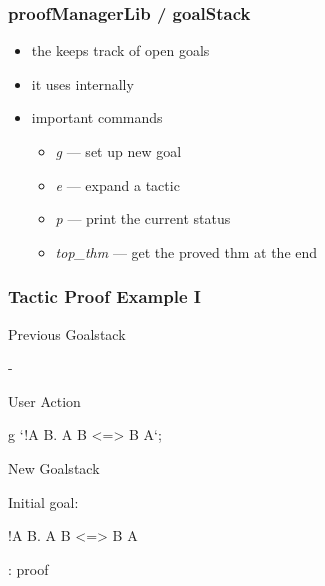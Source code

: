 \begin{frame}
\frametitle{proofManagerLib / goalStack}
\begin{itemize}
\item the  keeps track of open goals
\item it uses  internally
\item important commands
\begin{itemize}
\item \emph{g} --- set up new goal
\item \emph{e} --- expand a tactic
\item \emph{p} --- print the current status
\item \emph{top\_thm} --- get the proved thm at the end
\end{itemize}  
\end{itemize}
\end{frame}

\begin{frame}[fragile]
\frametitle{Tactic Proof Example I}

\begin{block}{Previous Goalstack}
\begin{semiverbatim}
-
\end{semiverbatim}
\end{block}

\begin{block}{User Action}
\begin{semiverbatim}
g `!A B. A \holAnd{} B <=> B \holAnd{} A`;
\end{semiverbatim}
\end{block}

\begin{block}{New Goalstack}
\begin{semiverbatim}
Initial goal:

!A B. A \holAnd{} B <=> B \holAnd{} A

: proof
\end{semiverbatim}
\end{block}
\end{frame}


